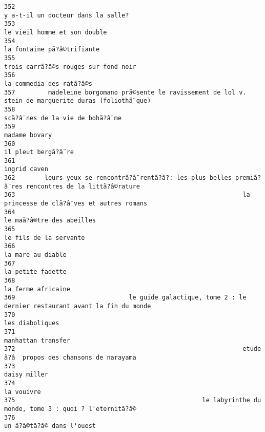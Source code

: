 \documentclass[
]{report}
\begin{document}
\begin{verbatim}
352                                                                      y a-t-il un docteur dans la salle?
353                                                                            le vieil homme et son double
354                                                                              la fontaine pã?â©trifiante
355                                                                    trois carrã?â©s rouges sur fond noir
356                                                                                la commedia des ratã?â©s
357         madeleine borgomano prã©sente le ravissement de lol v. stein de marguerite duras (foliothã¨que)
358                                                                        scã?â¨nes de la vie de bohã?â¨me
359                                                                                           madame bovary
360                                                                                     il pleut bergã?â¨re
361                                                                                            ingrid caven
362        leurs yeux se rencontrã?â¨rentã?â?: les plus belles premiã?â¨res rencontres de la littã?â©rature
363                                                              la princesse de clã?â¨ves et autres romans
364                                                                               le maã?â®tre des abeilles
365                                                                                  le fils de la servante
366                                                                                       la mare au diable
367                                                                                       la petite fadette
368                                                                                      la ferme africaine
369                               le guide galactique, tome 2 : le dernier restaurant avant la fin du monde
370                                                                                         les diaboliques
371                                                                                      manhattan transfer
372                                                              etude ã?â  propos des chansons de narayama
373                                                                                            daisy miller
374                                                                                              la vouivre
375                                                   le labyrinthe du monde, tome 3 : quoi ? l'eternitã?â©
376                                                                               un ã?â©tã?â© dans l'ouest

\end{verbatim}
\end{document}
